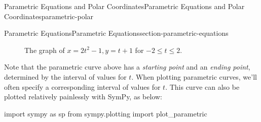 \documentclass[oneside,10pt,]{book}
\numberwithin{equation}{section}
\begin{document}
\begin{chapterptx}{Parametric Equations and Polar Coordinates}{}{Parametric Equations and Polar Coordinates}{}{}{parametric-polar}
\begin{sectionptx}{Parametric Equations}{}{Parametric Equations}{}{}{section-parametric-equations}
\begin{figure}
{
}
\caption{The graph of \(x = 2t^2-1, y=t+1\) for \(-2\leq t\leq 2\).\label{figure-parametric-parabola}}
\end{figure}
\hypertarget{p-990}{}%
Note that the parametric curve above has a \emph{starting point} and an \emph{ending point}, determined by the interval of values for \(t\). When plotting parametric curves, we'll often specify a corresponding interval of values for \(t\). This curve can also be plotted relatively painlessly with SymPy, as below:%
\begin{sageinput}
import sympy as sp
from sympy.plotting import plot_parametric


\end{sageinput}
\end{sectionptx}
\end{chapterptx}
\end{document}
